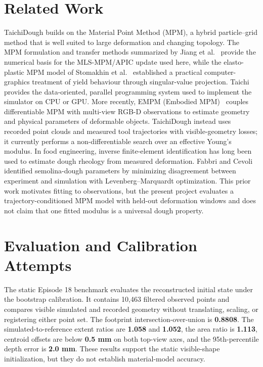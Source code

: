 \documentclass[10pt,a4paper]{article}
\begin{document}
\section{Related Work}

TaichiDough builds on the Material Point Method (MPM), a hybrid particle--grid method that is well suited to large deformation and changing topology. The MPM formulation and transfer methods summarized by Jiang et al.~\cite{jiang2016mpm} provide the numerical basis for the MLS-MPM/APIC update used here, while the elasto-plastic MPM model of Stomakhin et al.~\cite{stomakhin2013snow} established a practical computer-graphics treatment of yield behaviour through singular-value projection. Taichi~\cite{hu2019taichi} provides the data-oriented, parallel programming system used to implement the simulator on CPU or GPU. More recently, EMPM (Embodied MPM)~\cite{chen2026empm} couples differentiable MPM with multi-view RGB-D observations to estimate geometry and physical parameters of deformable objects. TaichiDough instead uses recorded point clouds and measured tool trajectories with visible-geometry losses; it currently performs a non-differentiable search over an effective Young's modulus. In food engineering, inverse finite-element identification has long been used to estimate dough rheology from measured deformation. Fabbri and Cevoli~\cite{fabbri2015dough} identified semolina-dough parameters by minimizing disagreement between experiment and simulation with Levenberg--Marquardt optimization. This prior work motivates fitting to observations, but the present project evaluates a trajectory-conditioned MPM model with held-out deformation windows and does not claim that one fitted modulus is a universal dough property.

\section{Evaluation and Calibration Attempts}

The static Episode 18 benchmark evaluates the reconstructed initial state under the bootstrap calibration. It contains 10,463 filtered observed points and compares visible simulated and recorded geometry without translating, scaling, or registering either point set. The footprint intersection-over-union is \textbf{0.8808}. The simulated-to-reference extent ratios are \textbf{1.058} and \textbf{1.052}, the area ratio is \textbf{1.113}, centroid offsets are below \textbf{0.5 mm} on both top-view axes, and the 95th-percentile depth error is \textbf{2.0 mm}. These results support the static visible-shape initialization, but they do not establish material-model accuracy.
\end{document}
